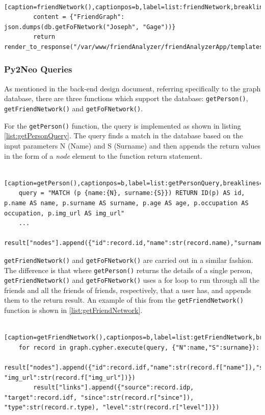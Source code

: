 \documentclass[12pt,onecolumn]{article}
\begin{document}
	\begin{lstlisting} [caption=friendNetwork(),captionpos=b,label=list:friendNetwork,breaklines=true]
		content = {"FriendGraph": json.dumps(db.getFoFNetwork("Joseph", "Gage"))}
		return render_to_response("/var/www/friendAnalyzer/friendAnalyzerApp/templates/network.html",content)
	\end{lstlisting}
	
	\subsubsection{Py2Neo Queries}
	
	As mentioned in the back-end design document, referring specifically to the graph database, there are three functions which support the database: \texttt{getPerson()}, \texttt{getFriendNetwork()} and \texttt{getFoFNetwork()}.
	
	For the \texttt{getPerson()} function, the query is implemented as shown in listing \ref{list:getPersonQuery}. The query finds a match in the database based on the input parameters {N} (Name) and {S} (Surname) and then appends the return values in the form of a \textit{node} element to the function return statement.
	
	\begin{lstlisting} [caption=getPerson(),captionpos=b,label=list:getPersonQuery,breaklines=true]
	query = "MATCH (p {name:{N}, surname:{S}}) RETURN ID(p) AS id, p.name AS name, p.surname AS surname, p.age AS age, p.occupation AS occupation, p.img_url AS img_url"
	...
	result["nodes"].append({"id":record.id,"name":str(record.name),"surname":str(record.surname),"age":record.age,"occupation":str(record.occupation),"img_url":str(record.img_url)})
	\end{lstlisting}
	
	\texttt{getFriendNetwork()} and \texttt{getFoFNetwork()} are carried out in a similar fashion. The difference is that where \texttt{getPerson()} returns the details of a single person, \texttt{getFriendNetwork()} and \texttt{getFoFNetwork()} uses a for loop to run through all the friends and all the friends of friends, respectively, that a user has, and appends them to the return result. An example of this from the \texttt{getFriendNetwork()} function is shown in \ref{list:getFriendNetwork}.
	
	\begin{lstlisting} [caption=getFriendNetwork(),captionpos=b,label=list:getFriendNetwork,breaklines=true]
	for record in graph.cypher.execute(query, {"N":name,"S":surname}):
		result["nodes"].append({"id":record.idf,"name":str(record.f["name"]),"surname":str(record.f["surname"]),"age":record.f["age"],"occupation":str(record.f["occupation"]), "img_url":str(record.f["img_url"])})
		result["links"].append({"source":record.idp, "target":record.idf, "since":str(record.r["since"]), "type":str(record.r.type), "level":str(record.r["level"])})
	\end{lstlisting}
	
\end{document}
